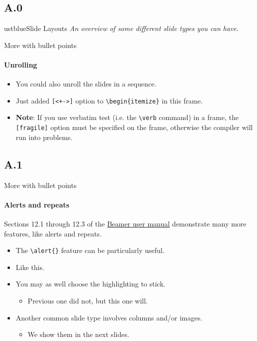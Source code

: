 \documentclass[]{beamer}
\newcommand{\hrefcol}[2]{\textcolor{uihteal}{\href{#1}{#2}}}
\begin{document}
\subsection{A.0}

\begin{chapter}{ustblue}{Slide Layouts}
\textit{An overview of some different slide types you can have.}
\end{chapter}


\begin{frame}[fragile]{More with bullet points}
\framesubtitle{Unrolling}
\begin{itemize}[<+->]
\item You could also unroll the slides in a sequence.
\item Just added \verb|[<+->]| option to \verb|\begin{itemize}| in this frame.
\item \textbf{Note}: If you use verbatim test (i.e. the \verb|\verb| command) in a frame, the \verb|[fragile]| option must be specified on the frame, otherwise the compiler will run into problems.
\end{itemize}
\end{frame}

\subsection{A.1}

\begin{frame}[fragile]{More with bullet points}
\framesubtitle{Alerts and repeats}
Sections 12.1 through 12.3 of the \hrefcol{https://www.ctan.org/tex-archive/macros/latex/contrib/beamer/doc/beameruserguide.pdf}{Beamer user
manual} demonstrate many more features, like alerts and repeats.
\begin{itemize}
\item The \verb|\alert{}| feature can be particularly useful.
\item Like \alert<2>{this}.
\item You may as well choose the highlighting to stick.
    \begin{itemize}
    \item Previous one did not, but \alert<3->{this one} will.
    \end{itemize}
\item Another common slide type involves columns and/or images.
    \begin{itemize}
    \item We show them in the \alert<4>{next slides}.
    \end{itemize}
\end{itemize}
\end{frame}
\end{document}
